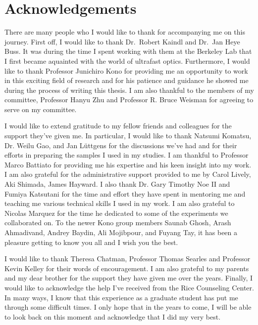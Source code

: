 \chapter*{Acknowledgements}

There are many people who I would like to thank for accompanying me on this journey. First off, I would like to thank Dr.\ Robert Kaindl and Dr.\ Jan Heye Buss. It was during the time I spent working with them at the Berkeley Lab that I first became aquainted with the world of ultrafast optics. Furthermore, I would like to thank Professor Junichiro Kono for providing me an opportunity to work in this exciting field of research and for his patience and guidance he showed me during the process of writing this thesis. I am also thankful to the members of my committee, Professor Hanyu Zhu and Professor R. Bruce Weisman for agreeing to serve on my committee.

I would like to extend gratitude to my fellow friends and colleagues for the support they've given me. In particular, I would like to thank Natsumi Komatsu, Dr. Weilu Gao, and Jan L{\"u}ttgens for the discussions we've had and for their efforts in preparing the samples I used in my studies. I am thankful to Professor Marco Battiato for providing me his expertise and his keen insight into my work. I am also grateful for the administrative support provided to me by Carol Lively, Aki Shimada, James Hayward. I also thank Dr. Gary Timothy Noe II and Fumiya Katsutani for the time and effort they have spent in mentoring me and teaching me various technical skills I used in my work. I am also grateful to Nicolas Marquez for the time he dedicated to some of the experiments we collaborated on. To the newer Kono group members Saunab Ghosh, Arash Ahmadivand, Andrey Baydin, Ali Mojibpour, and Fuyang Tay, it has been a pleasure getting to know you all and I wish you the best.

I would like to thank Theresa Chatman, Professor Thomas Searles and Professor Kevin Kelley for their words of encouragement. I am also grateful to my parents and my dear brother for the support they have given me over the years. Finally, I would like to acknowledge the help I've received from the Rice Counseling Center. In many ways, I know that this experience as a graduate student has put me through some difficult times. I only hope that in the years to come, I will be able to look back on this moment and acknowledge that I did my very best.
